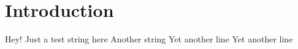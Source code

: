 \section{Introduction}

Hey!
Just a test string here
Another string
Yet another line
Yet another line
